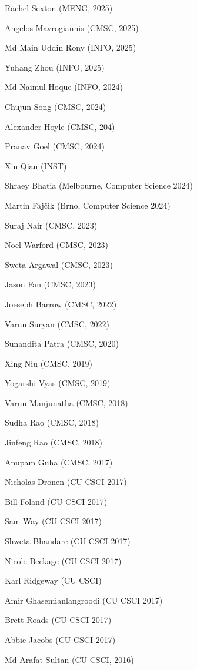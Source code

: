 {{  \begin{enumerate*}
    \item Rachel Sexton (MENG, 2025)
  \item Angelos Mavrogiannis (CMSC, 2025)
    \item Md Main Uddin Rony (INFO, 2025)
    \item Yuhang Zhou (INFO, 2025)
    \item Md Naimul Hoque (INFO, 2024)
  \item Chujun Song (CMSC, 2024)
    \item Alexander Hoyle (CMSC, 204)
  \item Pranav Goel (CMSC, 2024)
  \item Xin Qian (INST)
  \item Shraey Bhatia (Melbourne, Computer Science 2024)
    \item Martin Faj\v{c}ik (Brno, Computer Science 2024)    
  \item Suraj Nair (CMSC, 2023)
  \item Noel Warford (CMSC, 2023)
  \item Sweta Argawal (CMSC, 2023)
    \item Jason Fan (CMSC, 2023)    
  \item Joeseph Barrow (CMSC, 2022)
  \item Varun Suryan (CMSC, 2022)
    \item Sunandita Patra (CMSC, 2020)
\item Xing Niu (CMSC, 2019)
\item Yogarshi Vyas (CMSC, 2019)
\item Varun Manjunatha (CMSC, 2018)
\item Sudha Rao (CMSC, 2018)
\item Jinfeng Rao (CMSC, 2018)
\item Anupam Guha (CMSC, 2017)
\item Nicholas Dronen (CU CSCI 2017)
\item Bill Foland (CU CSCI 2017)
\item Sam Way (CU CSCI 2017)
\item Shweta Bhandare (CU CSCI 2017)
\item Nicole Beckage (CU CSCI 2017)
\item Karl Ridgeway (CU CSCI)
\item Amir Ghasemianlangroodi (CU CSCI 2017)
\item Brett Roads (CU CSCI 2017)
\item Abbie Jacobs (CU CSCI 2017)
\item Md Arafat Sultan (CU CSCI, 2016)

\end{enumerate*}}}
